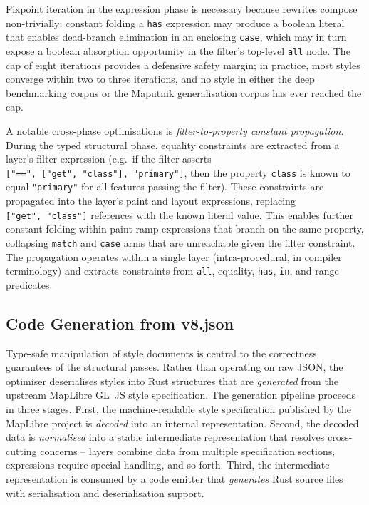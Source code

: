 Fixpoint iteration in the expression phase is necessary because rewrites compose non-trivially: constant folding a \texttt{has} expression may produce a boolean literal that enables dead-branch elimination in an enclosing \texttt{case}, which may in turn expose a boolean absorption opportunity in the filter's top-level \texttt{all} node.
The cap of eight iterations provides a defensive safety margin; in practice, most styles converge within two to three iterations, and no style in either the deep benchmarking corpus or the Maputnik generalisation corpus has ever reached the cap.

A notable cross-phase optimisations is \emph{filter-to-property constant propagation}.
During the typed structural phase, equality constraints are extracted from a layer's filter expression (e.g.\ if the filter asserts \texttt{["==",~["get",~"class"],~"primary"]}, then the property \texttt{class} is known to equal \texttt{"primary"} for all features passing the filter).
These constraints are propagated into the layer's paint and layout expressions, replacing \texttt{["get",~"class"]} references with the known literal value.
This enables further constant folding within paint ramp expressions that branch on the same property, collapsing \texttt{match} and \texttt{case} arms that are unreachable given the filter constraint.
The propagation operates within a single layer (intra-procedural, in compiler terminology) and extracts constraints from \texttt{all}, equality, \texttt{has}, \texttt{in}, and range predicates.

\subsection{Code Generation from v8.json}\label{sub_codegen}

Type-safe manipulation of style documents is central to the correctness guarantees of the structural passes.
Rather than operating on raw JSON, the optimiser deserialises styles into Rust structures that are \emph{generated} from the upstream MapLibre GL~JS style specification.
The generation pipeline proceeds in three stages.
First, the machine-readable style specification published by the MapLibre project is \emph{decoded} into an internal representation.
Second, the decoded data is \emph{normalised} into a stable intermediate representation that resolves cross-cutting concerns -- layers combine data from multiple specification sections, expressions require special handling, and so forth.
Third, the intermediate representation is consumed by a code emitter that \emph{generates} Rust source files with serialisation and deserialisation support.

